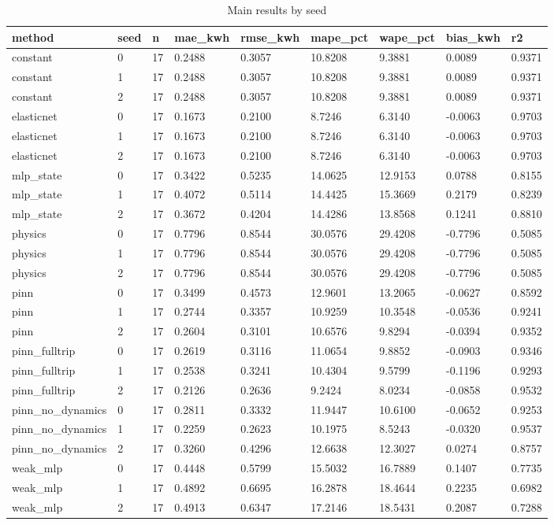 \begin{table}[t]
\centering
\caption{Main results by seed}
\label{tab:byseed}
\begin{tabular}{lllllllll}
\hline
method & seed & n & mae\_kwh & rmse\_kwh & mape\_pct & wape\_pct & bias\_kwh & r2 \\
\hline
constant & 0 & 17 & 0.2488 & 0.3057 & 10.8208 & 9.3881 & 0.0089 & 0.9371 \\
constant & 1 & 17 & 0.2488 & 0.3057 & 10.8208 & 9.3881 & 0.0089 & 0.9371 \\
constant & 2 & 17 & 0.2488 & 0.3057 & 10.8208 & 9.3881 & 0.0089 & 0.9371 \\
elasticnet & 0 & 17 & 0.1673 & 0.2100 & 8.7246 & 6.3140 & -0.0063 & 0.9703 \\
elasticnet & 1 & 17 & 0.1673 & 0.2100 & 8.7246 & 6.3140 & -0.0063 & 0.9703 \\
elasticnet & 2 & 17 & 0.1673 & 0.2100 & 8.7246 & 6.3140 & -0.0063 & 0.9703 \\
mlp\_state & 0 & 17 & 0.3422 & 0.5235 & 14.0625 & 12.9153 & 0.0788 & 0.8155 \\
mlp\_state & 1 & 17 & 0.4072 & 0.5114 & 14.4425 & 15.3669 & 0.2179 & 0.8239 \\
mlp\_state & 2 & 17 & 0.3672 & 0.4204 & 14.4286 & 13.8568 & 0.1241 & 0.8810 \\
physics & 0 & 17 & 0.7796 & 0.8544 & 30.0576 & 29.4208 & -0.7796 & 0.5085 \\
physics & 1 & 17 & 0.7796 & 0.8544 & 30.0576 & 29.4208 & -0.7796 & 0.5085 \\
physics & 2 & 17 & 0.7796 & 0.8544 & 30.0576 & 29.4208 & -0.7796 & 0.5085 \\
pinn & 0 & 17 & 0.3499 & 0.4573 & 12.9601 & 13.2065 & -0.0627 & 0.8592 \\
pinn & 1 & 17 & 0.2744 & 0.3357 & 10.9259 & 10.3548 & -0.0536 & 0.9241 \\
pinn & 2 & 17 & 0.2604 & 0.3101 & 10.6576 & 9.8294 & -0.0394 & 0.9352 \\
pinn\_fulltrip & 0 & 17 & 0.2619 & 0.3116 & 11.0654 & 9.8852 & -0.0903 & 0.9346 \\
pinn\_fulltrip & 1 & 17 & 0.2538 & 0.3241 & 10.4304 & 9.5799 & -0.1196 & 0.9293 \\
pinn\_fulltrip & 2 & 17 & 0.2126 & 0.2636 & 9.2424 & 8.0234 & -0.0858 & 0.9532 \\
pinn\_no\_dynamics & 0 & 17 & 0.2811 & 0.3332 & 11.9447 & 10.6100 & -0.0652 & 0.9253 \\
pinn\_no\_dynamics & 1 & 17 & 0.2259 & 0.2623 & 10.1975 & 8.5243 & -0.0320 & 0.9537 \\
pinn\_no\_dynamics & 2 & 17 & 0.3260 & 0.4296 & 12.6638 & 12.3027 & 0.0274 & 0.8757 \\
weak\_mlp & 0 & 17 & 0.4448 & 0.5799 & 15.5032 & 16.7889 & 0.1407 & 0.7735 \\
weak\_mlp & 1 & 17 & 0.4892 & 0.6695 & 16.2878 & 18.4644 & 0.2235 & 0.6982 \\
weak\_mlp & 2 & 17 & 0.4913 & 0.6347 & 17.2146 & 18.5431 & 0.2087 & 0.7288 \\
\hline
\end{tabular}
\end{table}

